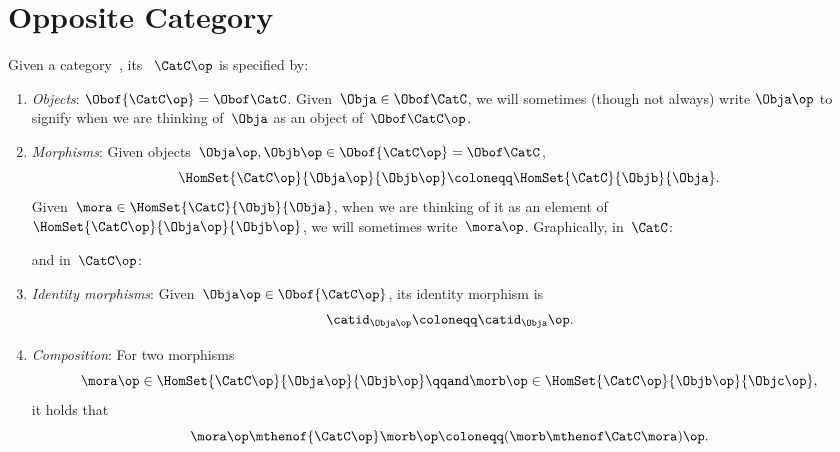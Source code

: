 
\section{Opposite Category}

\begin{ctdefinition}
    \label{def:opposite-category}
    \label{def:oppositecat}
    Given a category~\CatC, its \emph{}~$\CatC\op$ is specified by:
    \begin{enumerate}
        \item \emph{Objects}: $\Obof{\CatC\op} = \Obof\CatC$.
              Given~$\Obja \in  \Obof\CatC$, we will sometimes (though not always) write $\Obja\op$ to signify when we are thinking of~$\Obja$ as an object of~$\Obof\CatC\op$.

        \item \emph{Morphisms}: Given objects~$\Obja\op,  \Objb\op \in \Obof{\CatC\op} = \Obof\CatC$,
              \begin{equation}
                  \label{eq:homset-op-cat}
                  \HomSet{\CatC\op}{\Obja\op}{\Objb\op} \coloneqq \HomSet{\CatC}{\Objb}{\Obja}.
              \end{equation}
              Given~$\mora \in \HomSet{\CatC}{\Objb}{\Obja}$, when we are thinking of it as an element of~$\HomSet{\CatC\op}{\Obja\op}{\Objb\op}$, we will sometimes write~$\mora\op$.
              Graphically, in~$\CatC$:
              \begin{center}
              \end{center}
              and in~$\CatC\op$:
              \begin{center}
              \end{center}
        \item \emph{Identity morphisms}: Given~$\Obja\op \in \Obof{\CatC\op}$, its identity morphism is
              \begin{equation}
                  \catid_{\Obja\op} \coloneqq \catid_{\Obja}\op.
              \end{equation}
        \item \emph{Composition}: For two morphisms
              \begin{equation}
                  \mora\op \in \HomSet{\CatC\op}{\Obja\op}{\Objb\op}
                  \qqand
                  \morb\op \in \HomSet{\CatC\op}{\Objb\op}{\Objc\op},
              \end{equation}
              it holds that
              \begin{equation}
                  \mora\op \mthenof{\CatC\op} \morb\op \coloneqq (\morb \mthenof\CatC \mora)\op.
              \end{equation}
    \end{enumerate}
\end{ctdefinition}

